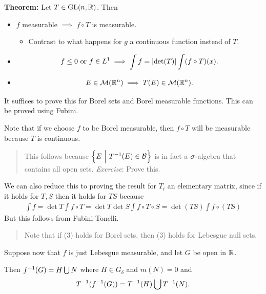 \textbf{Theorem:} Let \(T \in {\text{GL}}(n, {\mathbb{R}})\). Then

\begin{itemize}
\item
  \(f\) measurable \(\implies\) \(f\circ T\) is measurable.

  \begin{itemize}
  \tightlist
  \item
    Contrast to what happens for \(g\) a continuous function instead of
    \(T\).
  \end{itemize}
\item

  \begin{align*}
  f \leq 0 \text{ or } f\in L^1 \implies \int f = {\left\lvert {\det(T)} \right\rvert} \int (f\circ T)(x)
  .\end{align*}
\item

  \begin{align*}
  E \in \mathcal{M}({\mathbb{R}}^n) \implies T(E) \in \mathcal{M}({\mathbb{R}}^n)
  .\end{align*}
\end{itemize}

It suffices to prove this for Borel sets and Borel measurable functions.
This can be proved using Fubini.

Note that if we choose \(f\) to be Borel measurable, then \(f\circ T\)
will be measurable because \(T\) is continuous.

\begin{quote}
This follows because \(\left\{{E {~\mathrel{\Big|}~} T^{-1}(E) \in\mathcal{B}}\right\}\) is
in fact a \(\sigma{\hbox{-}}\)algebra that contains all open sets.
\emph{Exercise}: Prove this.
\end{quote}

We can also reduce this to proving the result for \(T_i\) an elementary
matrix, since if it holds for \(T,S\) then it holds for \(TS\) because
\begin{align*}
\int f = \det T \int f\circ T = \det T \det S \int f\circ T \circ S = \det(TS) \int f\circ(TS)
\end{align*} But this follows from Fubini-Tonelli.

\begin{quote}
Note that if (3) holds for Borel sets, then (3) holds for Lebesgue null
sets.
\end{quote}

Suppose now that \(f\) is just Lebesgue measurable, and let \(G\) be
open in \({\mathbb{R}}\).

Then \(f^{-1}(G) = H \bigcup N\) where \(H\in G_\delta\) and \(m(N) = 0\)
and
\begin{align*}
T^{-1}(f^{-1}(G)) = T^{-1}(H) \bigcup T^{-1}(N)
.\end{align*}

